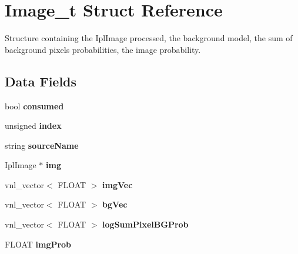 \hypertarget{structImage__t}{
\section{Image\_\-t Struct Reference}
\label{structImage__t}
}


Structure containing the IplImage processed, the background model, the sum of background pixels probabilities, the image probability.  


\subsection*{Data Fields}
\begin{DoxyCompactItemize}
\item 
\hypertarget{structImage__t_a5923b9221705546ddd88c92230707bd5}{
bool {\bfseries consumed}}
\label{structImage__t_a5923b9221705546ddd88c92230707bd5}

\item 
\hypertarget{structImage__t_a360ebf6209d16512186ca7adb893abbb}{
unsigned {\bfseries index}}
\label{structImage__t_a360ebf6209d16512186ca7adb893abbb}

\item 
\hypertarget{structImage__t_a70e97217df148a69be817ad343d4b2de}{
string {\bfseries sourceName}}
\label{structImage__t_a70e97217df148a69be817ad343d4b2de}

\item 
\hypertarget{structImage__t_aba816f4f00aa201710204894c1823010}{
IplImage $\ast$ {\bfseries img}}
\label{structImage__t_aba816f4f00aa201710204894c1823010}

\item 
\hypertarget{structImage__t_ae806150e23170d0a00f058f0635cec80}{
vnl\_\-vector$<$ FLOAT $>$ {\bfseries imgVec}}
\label{structImage__t_ae806150e23170d0a00f058f0635cec80}

\item 
\hypertarget{structImage__t_a281e2683a3de00712f92e4ee6e9159f9}{
vnl\_\-vector$<$ FLOAT $>$ {\bfseries bgVec}}
\label{structImage__t_a281e2683a3de00712f92e4ee6e9159f9}

\item 
\hypertarget{structImage__t_a252b26e36dd782024f829a141ddc64ce}{
vnl\_\-vector$<$ FLOAT $>$ {\bfseries logSumPixelBGProb}}
\label{structImage__t_a252b26e36dd782024f829a141ddc64ce}

\item 
\hypertarget{structImage__t_a970cc6500ff1d931365cd5660426a1b7}{
FLOAT {\bfseries imgProb}}
\label{structImage__t_a970cc6500ff1d931365cd5660426a1b7}

\end{DoxyCompactItemize}
